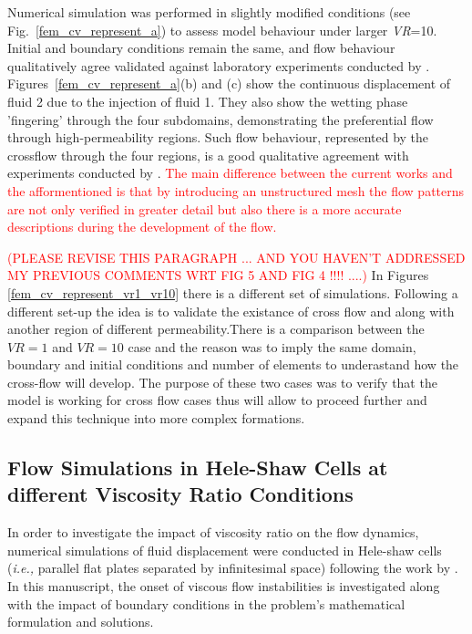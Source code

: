 \documentclass[preprint,authoryear,12pt]{elsarticle}
\newcommand{\red}{\textcolor{red}}
\newcommand{\ie}{{\it i.e., }}
\begin{document}
\medskip
Numerical simulation was performed in slightly modified conditions (see Fig.~\ref{fem_cv_represent_a}) to assess model behaviour under larger {\it VR}=10. Initial and boundary conditions remain the same, and flow behaviour qualitatively agree validated against laboratory experiments conducted by \citet{evans_1994}. Figures~\ref{fem_cv_represent_a}(b) and (c) show the continuous displacement of fluid 2 due to the injection of fluid 1. They also show the wetting phase 'fingering' through the four subdomains, demonstrating the preferential flow through high-permeability regions. Such flow behaviour, represented by the crossflow through the four regions, is a good qualitative agreement with experiments conducted by \citet{dawe_2008}. \red{The main difference between the current works and the afformentioned is that by introducing an unstructured mesh the flow patterns are not only verified in greater detail but also there is a more accurate descriptions during the development of the flow.}
    
\red{(PLEASE REVISE THIS PARAGRAPH ... AND YOU HAVEN'T ADDRESSED MY PREVIOUS COMMENTS WRT FIG 5 AND FIG 4 !!!! ....)}
In Figures \ref{fem_cv_represent_vr1_vr10} there is a different set of simulations. Following a different set-up the idea is to validate the existance of cross flow and along with another region of different permeability.There is a comparison between the $VR=1$ and $VR=10$ case and the reason was to imply the same domain, boundary and initial conditions and number of elements to underastand how the cross-flow will develop. The purpose of these two cases was to verify that the model is working for cross flow cases thus will allow to proceed further and expand this technique into more complex formations.    
  
\subsection{Flow Simulations in Hele-Shaw Cells at different Viscosity Ratio Conditions}\label{section:results_homo_hete} 
 
In order to investigate the impact of viscosity ratio on the flow dynamics, numerical simulations of fluid displacement were conducted in Hele-shaw cells (\ie parallel flat plates separated by infinitesimal space) following the work by \citet{saffman_1986}. In this manuscript, the onset of viscous flow instabilities \citep[following his seminal work in][]{saffman_1958} is investigated along with the impact of boundary conditions in the problem's mathematical formulation and solutions.
\end{document}
